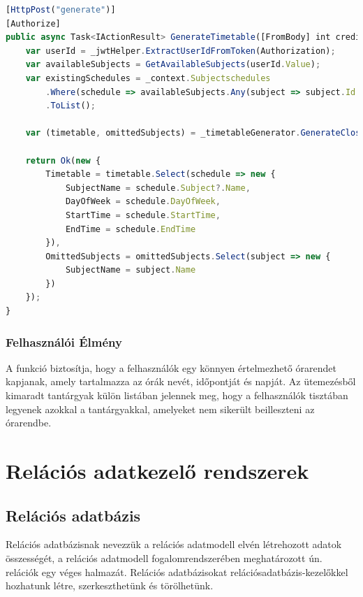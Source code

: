 \documentclass[colorlinks]{thesis-kando}
\theoremstyle{definition}
\theoremstyle{remark}
\begin{document}
\begin{lstlisting}[language=JavaScript]
[HttpPost("generate")]
[Authorize]
public async Task<IActionResult> GenerateTimetable([FromBody] int creditValue, [FromHeader(Name = "Authorization")] string Authorization) {
    var userId = _jwtHelper.ExtractUserIdFromToken(Authorization);
    var availableSubjects = GetAvailableSubjects(userId.Value);
    var existingSchedules = _context.Subjectschedules
        .Where(schedule => availableSubjects.Any(subject => subject.Id == schedule.SubjectId))
        .ToList();

    var (timetable, omittedSubjects) = _timetableGenerator.GenerateClosestTimetable(creditValue, availableSubjects, existingSchedules);

    return Ok(new {
        Timetable = timetable.Select(schedule => new {
            SubjectName = schedule.Subject?.Name,
            DayOfWeek = schedule.DayOfWeek,
            StartTime = schedule.StartTime,
            EndTime = schedule.EndTime
        }),
        OmittedSubjects = omittedSubjects.Select(subject => new {
            SubjectName = subject.Name
        })
    });
}
\end{lstlisting}

\subsection{Felhasználói Élmény}
A funkció biztosítja, hogy a felhasználók egy könnyen értelmezhető órarendet kapjanak, amely tartalmazza az órák nevét, időpontját és napját. Az ütemezésből kimaradt tantárgyak külön listában jelennek meg, hogy a felhasználók tisztában legyenek azokkal a tantárgyakkal, amelyeket nem sikerült beilleszteni az órarendbe.

\chapter{Relációs adatkezelő rendszerek}

\section{Relációs adatbázis}

	Relációs adatbázisnak nevezzük a relációs adatmodell elvén létrehozott adatok összességét, a relációs adatmodell fogalomrendszerében meghatározott ún. relációk egy véges halmazát. Relációs adatbázisokat relációsadatbázis-kezelőkkel hozhatunk létre, szerkeszthetünk és törölhetünk.
\end{document}
